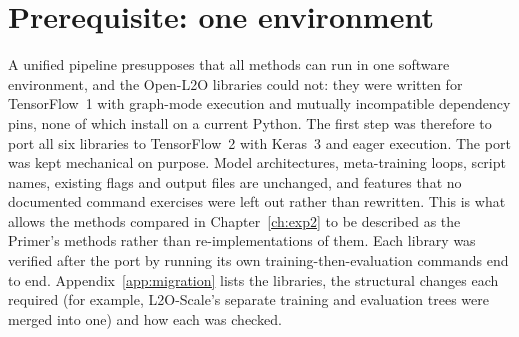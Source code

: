 \section{Prerequisite: one environment}
\label{sec:platform-migration}

A unified pipeline presupposes that all methods can run in one software
environment, and the Open-L2O libraries could not: they were written for
TensorFlow~1 with graph-mode execution and mutually incompatible dependency
pins, none of which install on a current Python. The first step was therefore
to port all six libraries to TensorFlow~2 with Keras~3 and eager execution.
The port was kept mechanical on purpose. Model architectures, meta-training
loops, script names, existing flags and output files are unchanged, and features that
no documented command exercises were left out rather than rewritten. This is
what allows the methods compared in Chapter~\ref{ch:exp2} to be described as
the Primer's methods rather than re-implementations of them. Each library was
verified after the port by running its own training-then-evaluation commands
end to end. Appendix~\ref{app:migration} lists the libraries, the structural
changes each required (for example, L2O-Scale's separate training and
evaluation trees were merged into one) and how each was checked.
